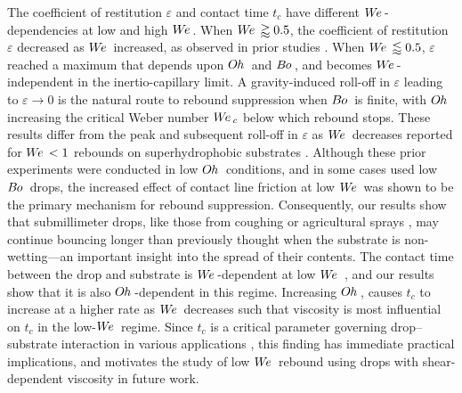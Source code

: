 \documentclass{jfm}
\newcommand{\We}{W\kern-0.15em e\,}
\newcommand{\Bo}{B\kern-0.05em o\,}
\newcommand{\Oh}{O\kern-0.05em h\,}
\begin{document}
The coefficient of restitution $\varepsilon$ and contact time $t_c$ have different $\We$-dependencies at low and high $\We$. When $\We \gtrapprox 0.5$, the coefficient of restitution $\varepsilon$ decreased as $\We$ increased, as observed in prior studies \citep{biance2006elasticity,jha2020viscous}. When $\We \lessapprox 0.5$, $\varepsilon$ reached a maximum that depends upon $\Oh$ and $\Bo$, and becomes $\We$-independent in the inertio-capillary limit. A gravity-induced roll-off in $\varepsilon$ leading to $\varepsilon \rightarrow 0$ is the natural route to rebound suppression when $\Bo$ is finite, with $\Oh$ increasing the critical Weber number $\We_c$ below which rebound stops. These results differ from the peak and subsequent roll-off in $\varepsilon$ as $\We$ decreases reported for $\We<1$ rebounds on superhydrophobic substrates \citep{richard2000bouncing,wang2022successive,thenarianto2023energy}. Although these prior experiments were conducted in low $\Oh$ conditions, and in some cases used low $\Bo$ drops, the increased effect of contact line friction at low $\We$ was shown to be the primary mechanism for rebound suppression. Consequently, our results show that submillimeter drops, like those from coughing \citep{dbouk2020coughing} or agricultural sprays \citep{kooij2018determines,makhnenko2021review,chen2022droplet}, may continue bouncing longer than previously thought when the substrate is non-wetting---an important insight into the spread of their contents. The contact time between the drop and substrate is $\We$-dependent at low $\We$ \citep{foote1975water,okumura2003water}, and our results show that it is also $\Oh$-dependent in this regime.  Increasing $\Oh$, causes $t_c$ to increase at a higher rate as $\We$ decreases such that viscosity is most influential on $t_c$ in the low-$\We$ regime. Since $t_c$ is a critical parameter governing drop--substrate interaction in various applications \cite{shiri2017heat,diaz2022charging}, this finding has immediate practical implications, and motivates the study of low $\We$ rebound using drops with shear-dependent viscosity in future work.
\end{document}
